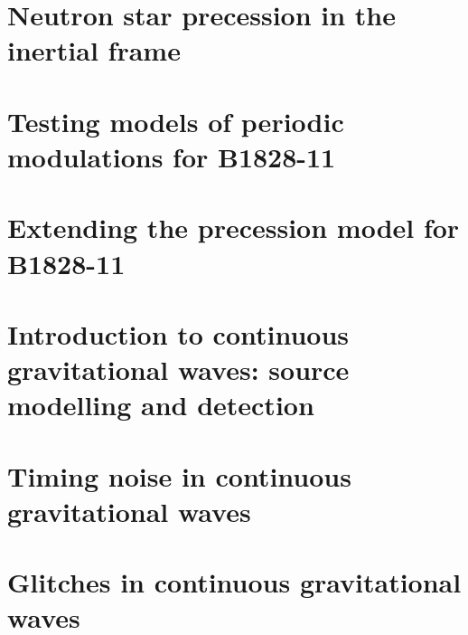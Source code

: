 \documentclass[twoside]{thesis}
\begin{document}
\chapter{Neutron star precession in the inertial frame}
\label{sec: inertial frame}


\chapter{Testing models of periodic modulations for B1828-11}
\label{sec: }


\chapter{Extending the precession model for B1828-11}
\chapter{Introduction to continuous gravitational waves: source modelling and detection}

\chapter{Timing noise in continuous gravitational waves}
\label{sec: timing noise in cgw}


\chapter{Glitches in continuous gravitational waves}



\end{document}
